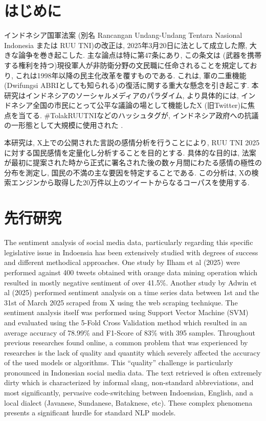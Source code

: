 \documentclass{jabstract}
\begin{document}
\maketitle

\begin{multicols}{2}
  
\section{はじめに}
インドネシア国軍法案 (別名 Rancangan Undang-Undang Tentara Nasional Indonesia または RUU TNI)の改正は, 2025年3月20日に法として成立した際, 大きな論争を巻き起こした. 主な論点は特に第47条にあり, この条文は (武器を携帯する権利を持つ)現役軍人が非防衛分野の文民職に任命されることを規定しており, これは1998年以降の民主化改革を覆すものである. これは, 軍の二重機能 (Dwifungsi ABRIとしても知られる)\cite{HRW2024}の復活に関する重大な懸念を引き起こす. 本研究はインドネシアのソーシャルメディアのパラダイム, より具体的には, インドネシア全国の市民にとって公平な議論の場として機能したX (旧Twitter)に焦点を当てる. \#TolakRUUTNIなどのハッシュタグが, インドネシア政府への抗議の一形態として大規模に使用された \cite{CNN2024}.

本研究は, X上での公開された言説の感情分析を行うことにより, RUU TNI 2025に対する国民感情を定量化し分析することを目的とする. 具体的な目的は, 法案が最初に提案された時から正式に署名された後の数ヶ月間にわたる感情の極性の分布を測定し, 国民の不満の主な要因を特定することである. この分析は, Xの検索エンジンから取得した20万件以上のツイートからなるコーパスを使用する.
\section{先行研究}
The sentiment analysis of social media data, particularly regarding this specific legislative issue in Indoensia has been extensively studied with degrees of success and different methodical approaches. One study by Ilham et al (2025) were performed against 400 tweets obtained with orange data mining operation which resulted in mostly negative sentiment of over 41.5\%\cite{Ilham2025}. Another study by Adwin et al (2025) performed sentiment analysis on a time series data between 1st and the 31st of March 2025 scraped from X using the web scraping technique. The sentiment analysis itself was performed using Support Vector Machine (SVM) and evaluated using the 5-Fold Cross Validation method which resulted in an average accuracy of 78.99\% and F1-Score of 83\%\cite{Nurhasananda_Akbar_2025} with 395 samples.
Throughout previous researches found online, a common problem that was experienced by researches is the lack of quality and quantity which severely affected the accuracy of the used models or algorithms. This ``quality'' challenge is particularly pronounced in Indonesian social media data. The text retrieved is often extremely dirty which is characterized by informal slang, non-standard abbreviations, and most significantly, pervasive code-switching between Indoensian, English, and a local dialect (Javanese, Sundanese, Bataknese, etc). These complex phenomena presents a significant hurdle for standard NLP models.


\end{multicols}
\end{document}
